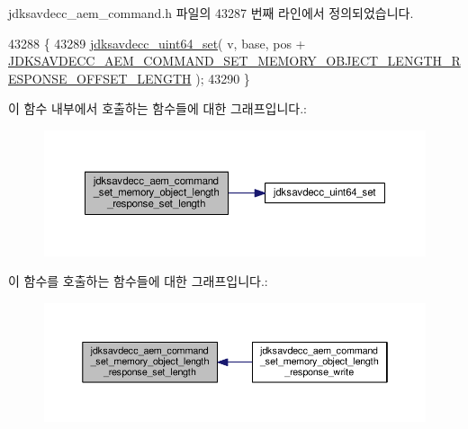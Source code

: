 jdksavdecc\+\_\+aem\+\_\+command.\+h 파일의 43287 번째 라인에서 정의되었습니다.


\begin{DoxyCode}
43288 \{
43289     \hyperlink{group__endian_ga48c6225616d8c003861be5c423a36631}{jdksavdecc\_uint64\_set}( v, base, pos + 
      \hyperlink{group__command__set__memory__object__length__response_ga0b1a77e125f9bb1d16b576adb8bc8021}{JDKSAVDECC\_AEM\_COMMAND\_SET\_MEMORY\_OBJECT\_LENGTH\_RESPONSE\_OFFSET\_LENGTH}
       );
43290 \}
\end{DoxyCode}


이 함수 내부에서 호출하는 함수들에 대한 그래프입니다.\+:
\nopagebreak
\begin{figure}[H]
\begin{center}
\leavevmode
\includegraphics[width=350pt]{group__command__set__memory__object__length__response_ga334e67c0c07f77b30388542f92d1b186_cgraph}
\end{center}
\end{figure}




이 함수를 호출하는 함수들에 대한 그래프입니다.\+:
\nopagebreak
\begin{figure}[H]
\begin{center}
\leavevmode
\includegraphics[width=350pt]{group__command__set__memory__object__length__response_ga334e67c0c07f77b30388542f92d1b186_icgraph}
\end{center}
\end{figure}


